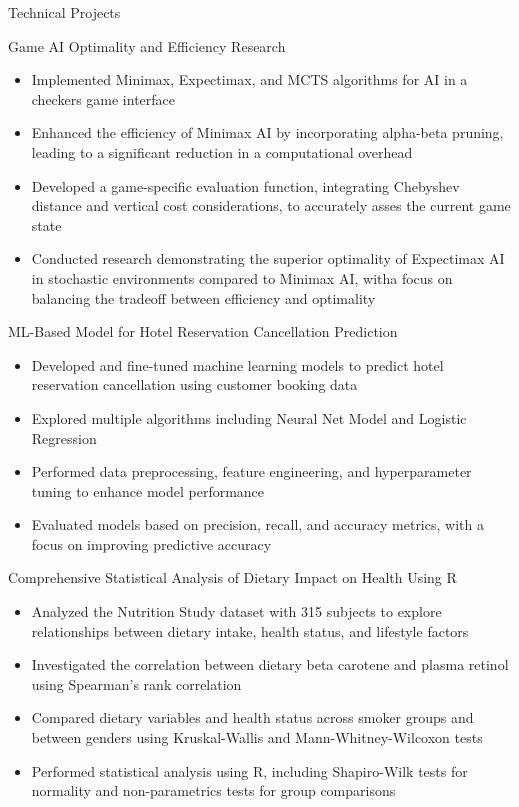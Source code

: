 \documentclass[calibri]{mcdowellcv}
\begin{document}
	\begin{cvsection}{Technical Projects}
		\begin{cvsubsection2}{Game AI Optimality and Efficiency Research}
			\begin{itemize}
				\item Implemented Minimax, Expectimax, and MCTS algorithms for AI in a checkers game interface
				\item Enhanced the efficiency of Minimax AI by incorporating alpha-beta pruning, leading to a significant reduction in a computational overhead
				\item Developed a game-specific evaluation function, integrating Chebyshev distance and vertical cost considerations, to accurately asses the current game state
				\item Conducted research demonstrating the superior optimality of Expectimax AI in stochastic environments compared to Minimax AI, witha focus on balancing the tradeoff between efficiency and optimality
			\end{itemize}
		\end{cvsubsection2}

		\begin{cvsubsection2}{ML-Based Model for Hotel Reservation Cancellation Prediction}
			\begin{itemize}
				\item Developed and fine-tuned machine learning models to predict hotel reservation cancellation using customer booking data
				\item Explored multiple algorithms including Neural Net Model and Logistic Regression
				\item Performed data preprocessing, feature engineering, and hyperparameter tuning to enhance model performance
				\item Evaluated models based on precision, recall, and accuracy metrics, with a focus on improving predictive accuracy
			\end{itemize}
		\end{cvsubsection2}

		\begin{cvsubsection2}{Comprehensive Statistical Analysis of Dietary Impact on Health Using R}
			\begin{itemize}
				\item Analyzed the Nutrition Study dataset with 315 subjects to explore relationships between dietary intake, health status, and lifestyle factors
				\item Investigated the correlation between dietary beta carotene and plasma retinol using Spearman's rank correlation
				\item Compared dietary variables and health status across smoker groups and between genders using Kruskal-Wallis and Mann-Whitney-Wilcoxon tests
				\item Performed statistical analysis using R, including Shapiro-Wilk tests for normality and non-parametrics tests for group comparisons
			\end{itemize}
		\end{cvsubsection2}
	\end{cvsection}
	
\end{document}
